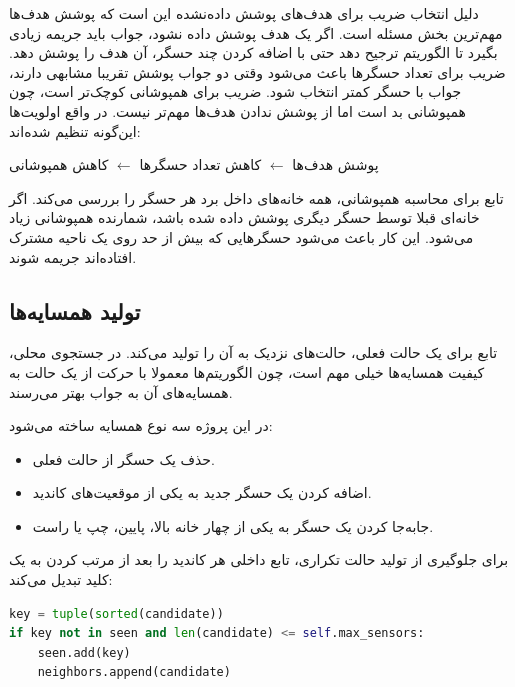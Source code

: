 \documentclass[10.5pt]{exam}
\begin{document}
دلیل انتخاب ضریب
برای هدف‌های پوشش داده‌نشده این است که پوشش هدف‌ها مهم‌ترین بخش مسئله است. اگر یک هدف پوشش داده نشود، جواب باید جریمه زیادی بگیرد تا الگوریتم ترجیح دهد حتی با اضافه کردن چند حسگر، آن هدف را پوشش دهد. ضریب
برای تعداد حسگرها باعث می‌شود وقتی دو جواب پوشش تقریبا مشابهی دارند، جواب با حسگر کمتر انتخاب شود. ضریب
برای همپوشانی کوچک‌تر است، چون همپوشانی بد است اما از پوشش ندادن هدف‌ها مهم‌تر نیست. در واقع اولویت‌ها این‌گونه تنظیم شده‌اند:

\begin{center}
پوشش هدف‌ها \(\leftarrow\) کاهش تعداد حسگرها \(\leftarrow\) کاهش همپوشانی
\end{center}

تابع
برای محاسبه همپوشانی، همه خانه‌های داخل برد هر حسگر را بررسی می‌کند. اگر خانه‌ای قبلا توسط حسگر دیگری پوشش داده شده باشد، شمارنده همپوشانی زیاد می‌شود. این کار باعث می‌شود حسگرهایی که بیش از حد روی یک ناحیه مشترک افتاده‌اند جریمه شوند.

\subsection{تولید همسایه‌ها}
تابع
برای یک حالت فعلی، حالت‌های نزدیک به آن را تولید می‌کند. در جستجوی محلی، کیفیت همسایه‌ها خیلی مهم است، چون الگوریتم‌ها معمولا با حرکت از یک حالت به همسایه‌های آن به جواب بهتر می‌رسند.

در این پروژه سه نوع همسایه ساخته می‌شود:

\begin{itemize}
    \item حذف یک حسگر از حالت فعلی.
    \item اضافه کردن یک حسگر جدید به یکی از موقعیت‌های کاندید.
    \item جابه‌جا کردن یک حسگر به یکی از چهار خانه بالا، پایین، چپ یا راست.
\end{itemize}

برای جلوگیری از تولید حالت تکراری، تابع داخلی
هر کاندید را بعد از مرتب کردن به یک کلید تبدیل می‌کند:

\begin{latin}
\begin{lstlisting}[language=Python]
key = tuple(sorted(candidate))
if key not in seen and len(candidate) <= self.max_sensors:
    seen.add(key)
    neighbors.append(candidate)
\end{lstlisting}
\end{latin}
\end{document}
